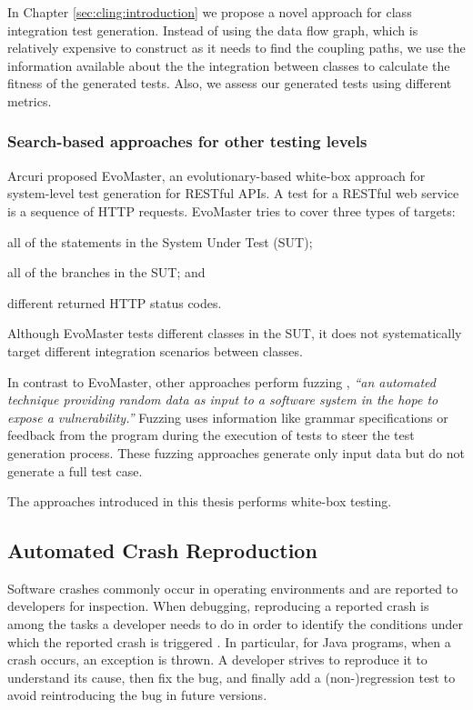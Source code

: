 In Chapter \ref{sec:cling:introduction} we propose a novel approach for class integration test generation.
Instead of using the data flow graph, which is relatively expensive to construct as it needs to find the coupling paths, we use the information available about the the integration between classes to calculate the fitness of the generated tests. Also, we assess our generated tests using different metrics.

\subsubsection{Search-based approaches for other testing levels}

Arcuri \cite{Arcuri2019} proposed EvoMaster, an evolutionary-based white-box approach for system-level test generation for RESTful APIs. A test for a RESTful web service is a sequence of HTTP requests. EvoMaster tries to cover three types of targets:
 \begin{inparaenum}[(i)]
 \item all of the statements in the System Under Test (SUT);
 \item all of the branches in the SUT; and
\item different returned HTTP status codes.
\end{inparaenum}
Although EvoMaster tests different classes in the SUT, it does not systematically target different integration scenarios between classes.

In contrast to EvoMaster, other approaches perform fuzzing \cite{Holler2012}, \textit{``an automated technique providing random data as input to a software system in the hope to expose a vulnerability.''} Fuzzing uses information like grammar specifications \cite{Holler2012, beyene2012, coppit2005, godefroid2008} or feedback from the program during the execution of tests \cite{Padhye2019} to steer the test generation process.
These fuzzing approaches generate only input data but do not generate a full test case.

The approaches introduced in this thesis performs white-box testing.

\subsection{Automated Crash Reproduction}
Software crashes commonly occur in operating environments and are reported to developers for inspection.
When debugging, reproducing a reported crash is among the tasks a developer needs to do in order to identify the conditions under which the reported crash is triggered \cite{Zeller2009, BellerICSE2018}.
In particular, for Java programs, when a crash occurs, an exception is thrown. A developer strives to reproduce it to understand its cause, then fix the bug, and finally add a (non-)regression test to avoid reintroducing the bug in future versions. 

